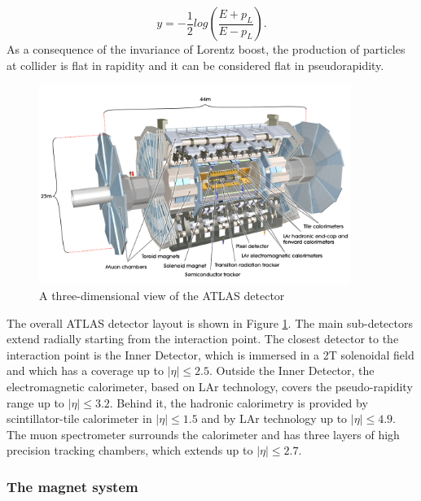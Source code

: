 \begin{equation}
y = -\frac{1}{2}log(\frac{E+p_L}{E-p_L}).
\end{equation}
As a consequence of the invariance of Lorentz boost, the production of particles at collider is flat in rapidity and it can be considered flat in pseudorapidity.\\
\begin{figure}
\center
\includegraphics[width=0.9\textwidth]{Images/atlas/ATLAS.jpg}
\caption{A three-dimensional view of the ATLAS detector}
\label{pic:atlas}
\end{figure}

The overall ATLAS detector layout is shown in Figure \ref{pic:atlas}. The main sub-detectors extend radially starting from the interaction point.
The closest detector to the interaction point is the Inner Detector, which is immersed in a 2T solenoidal field and which has a coverage up to $|\eta |\le 2.5$.
Outside the Inner Detector, the electromagnetic calorimeter, based on LAr technology, covers the pseudo-rapidity range up to $|\eta |\le 3.2$.
Behind it, the hadronic calorimetry is provided by scintillator-tile calorimeter in $|\eta |\le 1.5$ and by LAr technology up to $|\eta |\le 4.9$.
The muon spectrometer surrounds the calorimeter and has three layers of high precision tracking chambers, which extends up to $|\eta |\le 2.7$.

\subsubsection{The magnet system}

